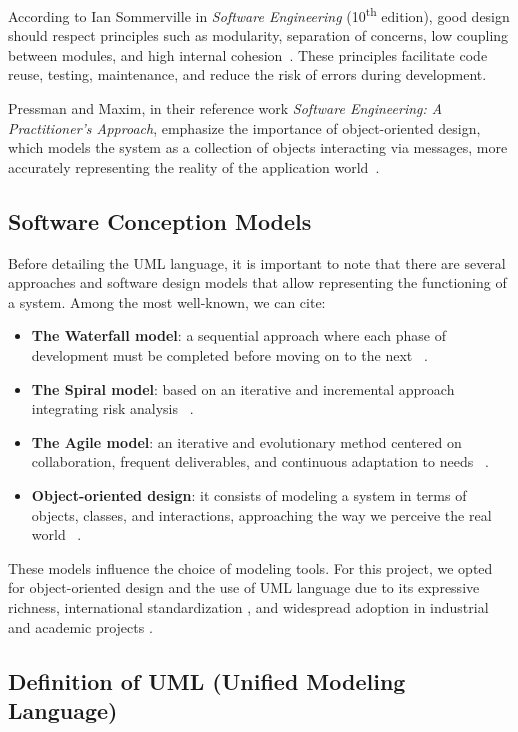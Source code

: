 \documentclass[12pt,a4paper]{report}
\begin{document}
According to Ian Sommerville in \textit{Software Engineering} (10\textsuperscript{th} edition), good design should respect principles such as modularity, separation of concerns, low coupling between modules, and high internal cohesion~\cite{sommerville2015}. These principles facilitate code reuse, testing, maintenance, and reduce the risk of errors during development.

Pressman and Maxim, in their reference work \textit{Software Engineering: A Practitioner's Approach}, emphasize the importance of object-oriented design, which models the system as a collection of objects interacting via messages, more accurately representing the reality of the application world~\cite{pressman2014}.

\subsection{Software Conception Models}
Before detailing the UML language, it is important to note that there are several approaches and software design models that allow representing the functioning of a system. Among the most well-known, we can cite:

\begin{itemize}
  \item \textbf{The Waterfall model}: a sequential approach where each phase of development must be completed before moving on to the next ~\cite{royce1970}.
  \item \textbf{The Spiral model}: based on an iterative and incremental approach integrating risk analysis ~\cite{boehm1988}.
  \item \textbf{The Agile model}: an iterative and evolutionary method centered on collaboration, frequent deliverables, and continuous adaptation to needs ~\cite{beck2001, cockburn2002}.
  \item \textbf{Object-oriented design}: it consists of modeling a system in terms of objects, classes, and interactions, approaching the way we perceive the real world ~\cite{booch1994, gamma1995}.
\end{itemize}

These models influence the choice of modeling tools. For this project, we opted for object-oriented design and the use of UML language due to its expressive richness, international standardization \cite{omg2017}, and widespread adoption in industrial and academic projects \cite{rumbaugh2004, fowler2004}.


\subsection{Definition of UML (Unified Modeling Language)}
\end{document}
